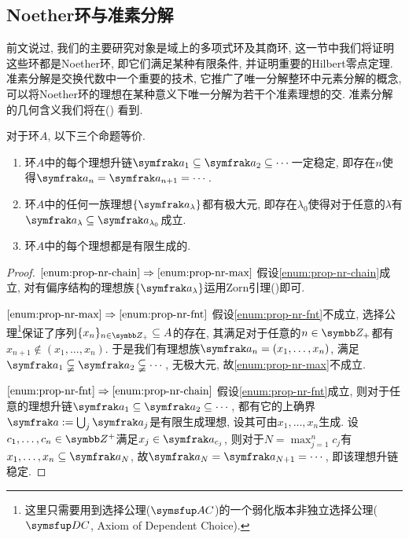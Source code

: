 \subsection{Noether环与准素分解}\label{subsec:primdecom}

前文说过, 我们的主要研究对象是域上的多项式环及其商环, 这一节中我们将证明这些环都是Noether环, 即它们满足某种有限条件, 并证明重要的Hilbert零点定理. 准素分解是交换代数中一个重要的技术, 它推广了唯一分解整环中元素分解的概念, 可以将Noether环的理想在某种意义下唯一分解为若干个准素理想的交. 准素分解的几何含义我们将在()%
看到.

\begin{proposition}\label{prop:noetherring}
    对于环$A$, 以下三个命题等价.
    \begin{enumerate}
        \item\label{enum:prop-nr-chain} 环$A$中的每个理想升链$\ideal{a}_1\subseteq\ideal{a}_2\subseteq\dotsb$一定稳定, 即存在$n$使得$\ideal{a}_n=\ideal{a}_{n+1}=\dotsb$.
        \item\label{enum:prop-nr-max} 环$A$中的任何一族理想$\{\ideal{a}_\lambda\}$都有极大元, 即存在$\lambda_0$使得对于任意的$\lambda$有$\ideal{a}_\lambda\subseteq\ideal{a}_{\lambda_0}$成立.
        \item\label{enum:prop-nr-fnt} 环$A$中的每个理想都是有限生成的.
    \end{enumerate}
\end{proposition}

\begin{proof}
    $\ref{enum:prop-nr-chain}\Rightarrow\ref{enum:prop-nr-max}$ 假设\ref{enum:prop-nr-chain}成立, 对有偏序结构的理想族$\{\ideal{a}_\lambda\}$运用Zorn引理()即可.

    $\ref{enum:prop-nr-max}\Rightarrow\ref{enum:prop-nr-fnt}$ 假设\ref{enum:prop-nr-fnt}不成立, 选择公理\footnote{这里只需要用到选择公理($\axiom{AC}$)的一个弱化版本非独立选择公理($\axiom{DC}$, Axiom of Dependent Choice).}保证了序列$\{x_n\}_{n\in\ZZ_+}\subseteq A$的存在, 其满足对于任意的$n\in\ZZ_+$都有$x_{n+1}\notin (x_1, \dotsc, x_n)$. 于是我们有理想族$\ideal{a}_n=(x_1, \dotsc, x_n)$, 满足$\ideal{a}_1\subsetneqq\ideal{a}_2\subsetneqq\dotsb$, 无极大元, 故\ref{enum:prop-nr-max}不成立.

    $\ref{enum:prop-nr-fnt}\Rightarrow\ref{enum:prop-nr-chain}$ 假设\ref{enum:prop-nr-fnt}成立, 则对于任意的理想升链$\ideal{a}_1\subseteq\ideal{a}_2\subseteq\dotsb$, 都有它的上确界$\ideal{a}:=\bigcup_{j}\ideal{a}_{j}$是有限生成理想, 设其可由$x_1, \dotsc, x_n$生成. 设$c_1, \dotsc, c_n\in \ZZ^+$满足$x_j\in\ideal{a}_{c_j}$, 则对于$N=\max_{j=1}^nc_j$有$x_1, \dotsc, x_n\subseteq\ideal{a}_N$, 故$\ideal{a}_N=\ideal{a}_{N+1}=\dotsb$, 即该理想升链稳定.
\end{proof}

